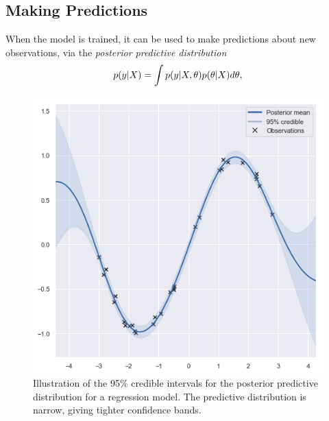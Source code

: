 \subsection{Making Predictions}
When the model is trained, it can be used to make predictions
about new observations, via the \textit{posterior
  predictive distribution}
\begin{equation}
  \label{eq:posterior-predictive}
  p(y \vert X) = \int p(y|X,\theta)p(\theta \vert X) d \theta,
\end{equation}
\begin{figure}
  \begin{minipage}{.46\textwidth}
    \includegraphics[scale=0.48,width=\textwidth]{figures/high-confidence}
    \caption{Illustration of the 95\% credible intervals for the
    posterior predictive distribution for a regression model. The 
    predictive distribution is narrow, giving tighter
    confidence bands.}\label{fig:high-confidence}
  \end{minipage}
  \hspace{5pt}
  \begin{minipage}{.46\textwidth}

\end{minipage}
\end{figure}
